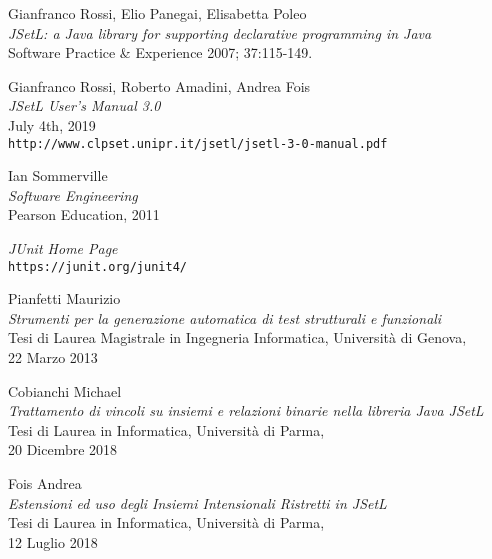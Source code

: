 \begin{thebibliography}{100}

Gianfranco Rossi, Elio Panegai, Elisabetta Poleo \\
\emph{JSetL: a Java library for supporting declarative programming in Java} \\
Software Practice \& Experience 2007; 37:115-149.

Gianfranco Rossi, Roberto Amadini, Andrea Fois \\
\emph{JSetL User's Manual 3.0}\\
July 4th, 2019\\
\texttt{http://www.clpset.unipr.it/jsetl/jsetl-3-0-manual.pdf}

Ian Sommerville\\
\emph{Software Engineering} \\
Pearson Education, 2011

\emph{JUnit Home Page}\\
\texttt{https://junit.org/junit4/}

Pianfetti Maurizio \\
\emph{Strumenti per la generazione automatica di test strutturali e funzionali}\\
Tesi di Laurea Magistrale in Ingegneria Informatica, Università di Genova,\\ 22 Marzo 2013

Cobianchi Michael \\
\emph{Trattamento di vincoli su insiemi e relazioni binarie nella libreria Java JSetL}\\
Tesi di Laurea in Informatica, Università di Parma,\\ 20 Dicembre 2018

Fois Andrea \\
\emph{Estensioni ed uso degli Insiemi Intensionali Ristretti in JSetL}\\
Tesi di Laurea in Informatica, Università di Parma,\\ 12 Luglio 2018


\end{thebibliography}
